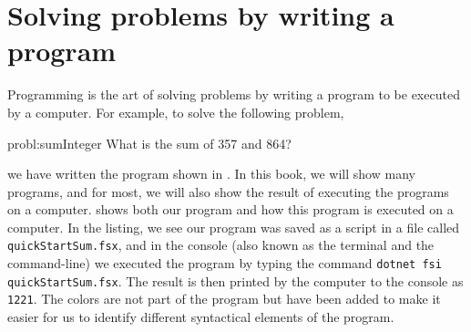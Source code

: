 \documentclass[fsharpNotes.tex]{subfiles}
\begin{document}
\chapter{Solving problems by writing a program}
\label{chap:quickStartGuide}


Programming is the art of solving problems by writing a program to be executed by a computer. For example, to solve the following problem,
%
\begin{task}{probl:sumInteger}
  What is the sum of 357 and 864?
\end{task}
%
we have written the program shown in .
%
%
In this book, we will show many programs, and for most, we will also show the result of executing the programs on a computer.  shows both our program and how this program is executed on a computer. In the listing, we see our program was saved as a script in a file called \lstinline[language=console]{quickStartSum.fsx}, and in the console (also known as the terminal and the command-line) we executed the program by typing the command \lstinline[language=console]|dotnet fsi quickStartSum.fsx|. The result is then printed by the computer to the console as \lstinline{1221}. The colors are not part of the program but have been added to make it easier for us to identify different syntactical elements of the program.
\end{document}
